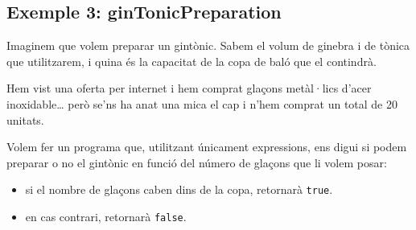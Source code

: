 \documentclass[]{book}
\newenvironment{Shaded}{\begin{snugshade}}{\end{snugshade}}
\newcommand{\DataTypeTok}[1]{\textcolor[rgb]{0.13,0.29,0.53}{#1}}
\newcommand{\DecValTok}[1]{\textcolor[rgb]{0.00,0.00,0.81}{#1}}
\newcommand{\CharTok}[1]{\textcolor[rgb]{0.31,0.60,0.02}{#1}}
\newcommand{\SpecialCharTok}[1]{\textcolor[rgb]{0.00,0.00,0.00}{#1}}
\newcommand{\StringTok}[1]{\textcolor[rgb]{0.31,0.60,0.02}{#1}}
\newcommand{\ImportTok}[1]{#1}
\newcommand{\CommentTok}[1]{\textcolor[rgb]{0.56,0.35,0.01}{\textit{#1}}}
\newcommand{\ControlFlowTok}[1]{\textcolor[rgb]{0.13,0.29,0.53}{\textbf{#1}}}
\newcommand{\PreprocessorTok}[1]{\textcolor[rgb]{0.56,0.35,0.01}{\textit{#1}}}
\newcommand{\NormalTok}[1]{#1}
\providecommand{\tightlist}{%
  \setlength{\itemsep}{0pt}\setlength{\parskip}{0pt}}
\begin{document}
\begin{Shaded}
\end{Shaded}

\subsection{Exemple 3:
ginTonicPreparation}\label{exemple-3-gintonicpreparation}

Imaginem que volem preparar un gintònic. Sabem el volum de ginebra i de
tònica que utilitzarem, i quina és la capacitat de la copa de baló que
el contindrà.

Hem vist una oferta per internet i hem comprat glaçons metàl·lics d'acer
inoxidable\ldots{} però se'ns ha anat una mica el cap i n'hem comprat un
total de 20 unitats.

Volem fer un programa que, utilitzant únicament expressions, ens digui
si podem preparar o no el gintònic en funció del número de glaçons que
li volem posar:

\begin{itemize}
\tightlist
\item
  si el nombre de glaçons caben dins de la copa, retornarà
  \texttt{true}.
\item
  en cas contrari, retornarà \texttt{false}.
\end{itemize}
\end{document}
